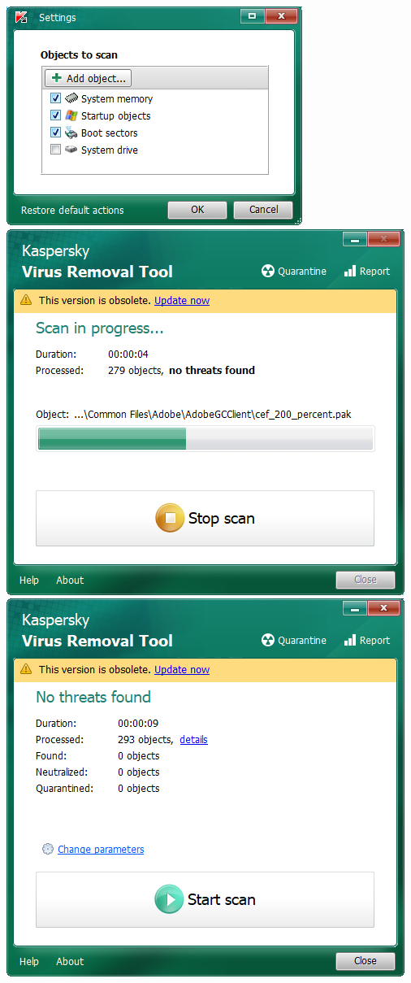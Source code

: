 \documentclass{book}
\begin{document}
\begin{center}
	\includegraphics[scale=0.6]{pic/kvrt_conf.PNG}
	\includegraphics[scale=0.4]{pic/kvrt_ing.PNG}    \includegraphics[scale=0.4]{pic/kvrt_compl.PNG}
\end{center}
\end{document}
